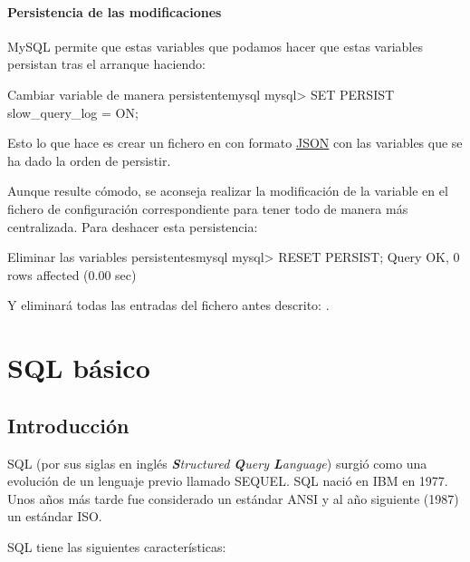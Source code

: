 \subsubsection{Persistencia de las modificaciones}
MySQL permite que estas variables que podamos hacer que estas variables persistan tras el arranque haciendo:

\begin{mycode}{Cambiar variable de manera persistente}{mysql}{}
mysql> SET PERSIST slow_query_log  = ON;
\end{mycode}

Esto lo que hace es crear un fichero en  con formato \hyperlink{json}{JSON} con las variables que se ha dado la orden de persistir.


Aunque resulte cómodo, se aconseja realizar la modificación de la variable en el fichero de configuración correspondiente para tener todo de manera más centralizada. Para deshacer esta persistencia:

\begin{mycode}{Eliminar las variables persistentes}{mysql}{}
mysql> RESET PERSIST;
Query OK, 0 rows affected (0.00 sec)
\end{mycode}

Y eliminará todas las entradas del fichero antes descrito: .

\chapter{SQL básico}
\section{Introducción}
SQL (por sus siglas en inglés \textit{\textbf{S}tructured \textbf{Q}uery \textbf{L}anguage}) surgió como una evolución de un lenguaje previo llamado SEQUEL. SQL nació en IBM en 1977. Unos años más tarde fue considerado un estándar ANSI y al año siguiente (1987) un estándar ISO.

SQL tiene las siguientes características:

